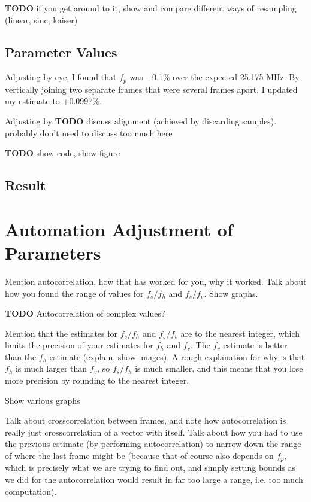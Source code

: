 \documentclass{article}
\newcommand*{\TODO}{\textbf{TODO}\xspace}
\begin{document}
\textbf{TODO} if you get around to it, show and compare different ways of resampling (linear, sinc, kaiser)

\subsection*{Parameter Values}

Adjusting by eye, I found that $f_p$ was +0.1\% over the expected 25.175 MHz. By vertically joining two separate frames that were several frames apart, I updated my estimate to +0.0997\%.

Adjusting by \TODO discuss alignment (achieved by discarding samples). probably don't need to discuss too much here

\textbf{TODO} show code, show figure

\subsection*{Result}

\section*{Automation Adjustment of Parameters}

Mention autocorrelation, how that has worked for you, why it worked.
Talk about how you found the range of values for $f_s / f_h$ and $f_s / f_v$. Show graphs.

\textbf{TODO} Autocorrelation of complex values?

Mention that the estimates for $f_s / f_h$ and $f_s / f_v$ are to the nearest integer, which limits the precision of your estimates for $f_h$ and $f_v$. The $f_v$ estimate is better than the $f_h$ estimate (explain, show images). A rough explanation for why is that $f_h$ is much larger than $f_v$, so $f_s / f_h$ is much smaller, and this means that you lose more precision by rounding to the nearest integer.

Show various graphs

Talk about crosscorrelation between frames, and note how autocorrelation is really just crosscorrelation of a vector with itself. Talk about how you had to use the previous estimate (by performing autocorrelation) to narrow down the range of where the last frame might be (because that of course also depends on $f_p$, which is precisely what we are trying to find out, and simply setting bounds as we did for the autocorrelation would result in far too large a range, i.e. too much computation).
\end{document}
